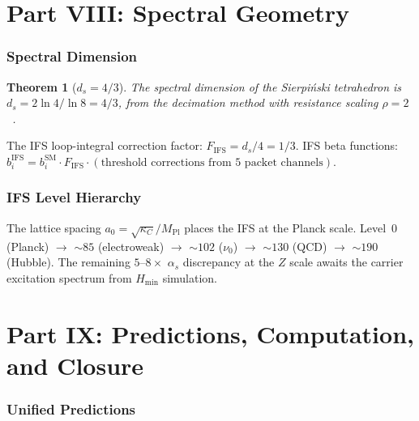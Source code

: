 \documentclass[11pt,twocolumn]{article}
\newtheorem{theorem}{Theorem}
\begin{document}

\part*{Part VIII: Spectral Geometry}

\section{Spectral Dimension}
\label{sec:spectral}

\begin{theorem}[$d_s=4/3$]
\label{thm:ds}
The spectral dimension of the Sierpi\'nski tetrahedron is $d_s=2\ln 4/\ln 8=4/3$, from the decimation method with resistance scaling $\rho=2$~\cite{rammal1984}.
\end{theorem}

The IFS loop-integral correction factor: $F_{\mathrm{IFS}}=d_s/4=1/3$.
IFS beta functions: $b_i^{\mathrm{IFS}}=b_i^{\mathrm{SM}}\cdot F_{\mathrm{IFS}}\cdot(\text{threshold corrections from 5 packet channels})$.

\section{IFS Level Hierarchy}
\label{sec:hierarchy}

The lattice spacing $a_0=\sqrt{\kappa_C}/M_{\mathrm{Pl}}$ places the IFS at the Planck scale.
Level~0 (Planck) $\to$ ${\sim}85$ (electroweak) $\to$ ${\sim}102$ ($\nu_0$) $\to$ ${\sim}130$ (QCD) $\to$ ${\sim}190$ (Hubble).
The remaining $5$--$8\times$ $\alpha_s$ discrepancy at the $Z$ scale awaits the carrier excitation spectrum from $H_{\min}$ simulation.


\part*{Part IX: Predictions, Computation, and Closure}

\section{Unified Predictions}
\label{sec:predictions}
\end{document}
